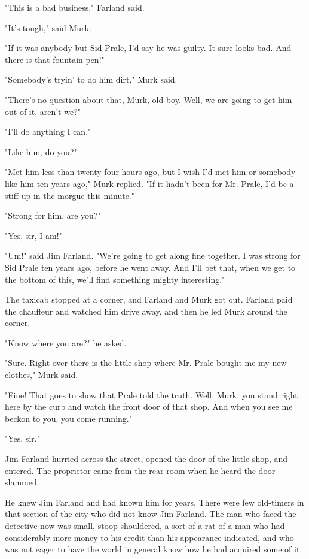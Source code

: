 \documentclass{novel}
\begin{document}
"This is a bad business," Farland said.

"It's tough," said Murk.

"If it was anybody but Sid Prale, I'd say he was guilty. It sure looks bad. And there is that fountain pen!"

"Somebody's tryin' to do him dirt," Murk said.

"There's no question about that, Murk, old boy. Well, we are going to get him out of it, aren't we?"

"I'll do anything I can."

"Like him, do you?"

"Met him less than twenty-four hours ago, but I wish I'd met him or somebody like him ten years ago," Murk replied. "If it hadn't been for Mr. Prale, I'd be a stiff up in the morgue this minute."

"Strong for him, are you?"

"Yes, sir, I am!"

"Um!" said Jim Farland. "We're going to get along fine together. I was strong for Sid Prale ten years ago, before he went away. And I'll bet that, when we get to the bottom of this, we'll find something mighty interesting."

The taxicab stopped at a corner, and Farland and Murk got out. Farland paid the chauffeur and watched him drive away, and then he led Murk around the corner.

"Know where you are?" he asked.

"Sure. Right over there is the little shop where Mr. Prale bought me my new clothes," Murk said.

"Fine! That goes to show that Prale told the truth. Well, Murk, you stand right here by the curb and watch the front door of that shop. And when you see me beckon to you, you come running."

"Yes, sir."

Jim Farland hurried across the street, opened the door of the little shop, and entered. The proprietor came from the rear room when he heard the door slammed.

He knew Jim Farland and had known him for years. There were few old-timers in that section of the city who did not know Jim Farland. The man who faced the detective now was small, stoop-shouldered, a sort of a rat of a man who had considerably more money to his credit than his appearance indicated, and who was not eager to have the world in general know how he had acquired some of it.
\end{document}
